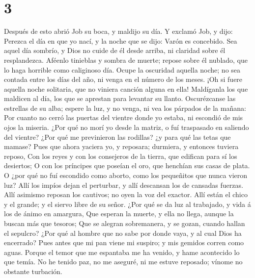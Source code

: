 \hypertarget{section-2}{%
\section{3}\label{section-2}}

 Después de esto abrió Job su boca, y maldijo su día.
 Y exclamó Job, y dijo:  Perezca el día en que
yo nací, y la noche que se dijo: Varón es concebido.  Sea
aquel día sombrío, y Dios no cuide de él desde arriba, ni claridad sobre
él resplandezca.  Aféenlo tinieblas y sombra de muerte;
repose sobre él nublado, que lo haga horrible como caliginoso día.
 Ocupe la oscuridad aquella noche; no sea contada entre los
días del año, ni venga en el número de los meses.  ¡Oh si
fuere aquella noche solitaria, que no viniera canción alguna en ella!
 Maldíganla los que maldicen al día, los que se aprestan
para levantar su llanto.  Oscurézcanse las estrellas de su
alba; espere la luz, y no venga, ni vea los párpados de la mañana:
 Por cuanto no cerró las puertas del vientre donde yo
estaba, ni escondió de mis ojos la miseria.  ¿Por qué no
morí yo desde la matriz, o fuí traspasado en saliendo del vientre?
 ¿Por qué me previnieron las rodillas? ¿y para qué las
tetas que mamase?  Pues que ahora yaciera yo, y reposara;
durmiera, y entonces tuviera reposo,  Con los reyes y con
los consejeros de la tierra, que edifican para sí los desiertos;
 O con los príncipes que poseían el oro, que henchían sus
casas de plata.  O ¿por qué no fuí escondido como aborto,
como los pequeñitos que nunca vieron luz?  Allí los impíos
dejan el perturbar, y allí descansan los de cansadas fuerzas.
 Allí asimismo reposan los cautivos; no oyen la voz del
exactor.  Allí están el chico y el grande; y el siervo
libre de su señor.  ¿Por qué se da luz al trabajado, y vida
á los de ánimo en amargura,  Que esperan la muerte, y ella
no llega, aunque la buscan más que tesoros;  Que se alegran
sobremanera, y se gozan, cuando hallan el sepulcro?  ¿Por
qué al hombre que no sabe por donde vaya, y al cual Dios ha encerrado?
 Pues antes que mi pan viene mi suspiro; y mis gemidos
corren como aguas.  Porque el temor que me espantaba me ha
venido, y hame acontecido lo que temía.  No he tenido paz,
no me aseguré, ni me estuve reposado; vínome no obstante turbación.

